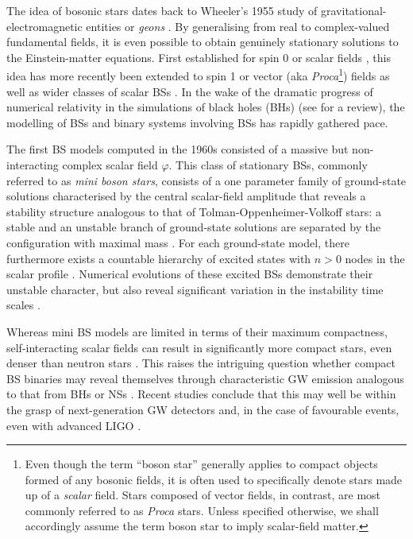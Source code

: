 \documentclass[]{iopart}
\begin{document}
The idea of bosonic stars dates back to Wheeler's 1955 study of
gravitational-electromagnetic entities or {\it geons}
\cite{Wheeler:1955zz}.  By generalising from real to complex-valued
fundamental fields, it is even possible to obtain genuinely stationary
solutions to the Einstein-matter equations. First established for
spin 0 or scalar fields \cite{Feinblum:1968nwc,Kaup:1968zz,Ruffini:1969qy},
this idea has more recently been extended to spin 1 or vector (aka
{\it Proca}\footnote{Even though the term ``boson star''
generally applies to compact objects formed of any bosonic
fields, it is often used to specifically denote stars made
up of a {\it scalar} field. Stars
composed of vector fields, in contrast, are most commonly
referred to as {\it Proca} stars. Unless specified otherwise,
we shall accordingly assume the term boson star to imply
scalar-field matter.})
fields \cite{Brito:2015pxa} as well as wider classes of scalar BSs
\cite{Alcubierre:2018ahf,Choptuik:2019zji}.  In the wake of the
dramatic progress of numerical relativity in the simulations of
black holes (BHs) \cite{Pretorius:2005gq,Campanelli:2005dd,Baker:2005vv}
(see \cite{Sperhake:2014wpa} for a review), the modelling of BSs
and binary systems involving BSs has rapidly gathered pace.

The first BS models computed in the 1960s consisted of a massive
but non-interacting complex scalar field $\varphi$.  This class of
stationary BSs, commonly referred to as {\it mini boson stars},
consists of a one parameter family of ground-state solutions
characterised by the central scalar-field amplitude that reveals a
stability structure analogous to that of Tolman-Oppenheimer-Volkoff
\cite{Tolman:1939jz,Oppenheimer:1939ne} stars: a stable and an
unstable branch of ground-state solutions are separated by the
configuration with maximal mass
\cite{Breit:1983nr,Gleiser:1988ih,Seidel:1990jh}. For each ground-state
model, there furthermore exists a countable hierarchy of excited
states with $n>0$ nodes in the scalar profile
\cite{Lee:1991ax,Jetzer:1991jr,Liddle:1992fmk}. Numerical evolutions
of these excited BSs demonstrate their unstable character, but also
reveal significant variation in the instability time scales
\cite{Balakrishna:1997ej}.

Whereas mini BS models are limited in terms of their maximum
compactness, self-interacting scalar fields can result in significantly
more compact stars, even denser than neutron stars
\cite{Colpi:1986ye,Lee:1986ts,Schunck:1999zu,Hartmann:2012da}. This
raises the intriguing question whether compact BS binaries may
reveal themselves through characteristic GW emission analogous to
that from BHs or NSs \cite{Bustillo:2020syj}. Recent studies conclude
that this may well be within the grasp of next-generation GW detectors
and, in the case of favourable events, even with advanced LIGO
\cite{Sennett:2017etc,DiGiovanni:2020ror,Toubiana:2020lzd}.
\end{document}
